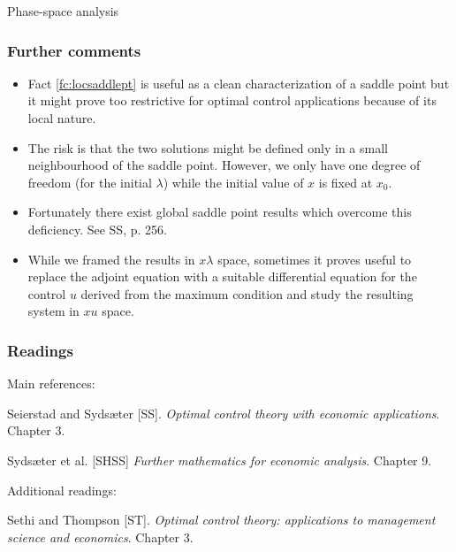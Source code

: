 \documentclass[10pt]{beamer}
\theoremstyle{definition}
\begin{document}
\begin{section}{Phase-space analysis}
\begin{frame}[fragile]
\frametitle{Further comments}
\begin{itemize}\itemsep1em
\item Fact \ref{fc:locsaddlept} is useful as a clean characterization of a saddle point but it might prove too restrictive for optimal control applications because of its local nature.
\item The risk is that the two solutions might be defined only in a small neighbourhood of the saddle point. However, we only have one degree of freedom (for the initial $ \lambda $) while the initial value of $ x $ is fixed at $ x_0 $.
\item Fortunately there exist global saddle point results which overcome this deficiency. See SS, p. 256.
\item While we framed the results in $ x\lambda $ space, sometimes it proves useful to replace the adjoint equation with a suitable differential equation for the control $ u $ derived from the maximum condition and study the resulting system in $ xu $ space.
\end{itemize}
\end{frame}

\end{section}

\begin{frame}[fragile]
\frametitle{Readings}
Main references:\bigskip

Seierstad and Syds\ae{}ter [SS]. \emph{Optimal control theory with economic applications}. Chapter 3.

Syds\ae{}ter et al. [SHSS] \emph{Further mathematics for economic analysis}. Chapter 9.\bigskip

Additional readings:

Sethi and Thompson [ST]. \emph{Optimal control theory: applications to management science and economics}. Chapter 3.
\end{frame}
\end{document}
